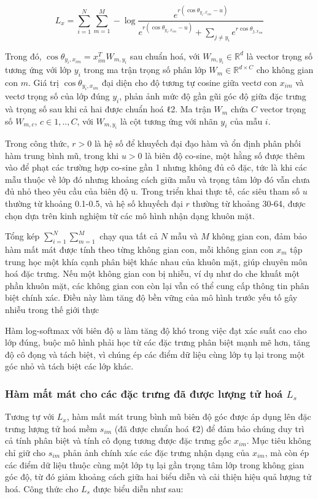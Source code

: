 \begin{equation}
    L_x = \sum_{i=1}^N \sum_{m=1}^M - \log \frac{e^{r(\cos\theta_{y_i, x_{im}} - u)}}{e^{r(\cos\theta_{y_i, x_{im}} - u)} + \sum_{j \neq y_i} e^{r\cos\theta_{j, x_{im}}}}
\end{equation}

Trong đó, $\cos \theta_{y_i, x_{im}} = x^T_{im} W_{m,y_i}$ sau chuẩn hoá, với $W_{m,y_i} \in \mathbb{R}^d$ là vector trọng số tương ứng với lớp $y_i$ trong ma trận trọng số phân lớp $W_m \in \mathbb{R}^{d \times C}$ cho không gian con $m$. Giá trị $\cos \theta_{y_i, x_{im}}$ đại diện cho độ tương tự cosine giữa vectơ con $x_{im}$ và vectơ trọng số của lớp đúng $y_i$, phản ảnh mức độ gần gũi góc độ giữa đặc trưng và trọng số sau khi cả hai được chuẩn hoá ℓ2. Ma trận $W_m$ chứa $C$ vector trọng số $W_{m,c}$, $ c \in {1,..,C}$, với $W_{m,y_i}$ là cột tương ứng với nhãn $y_i$ của mẫu $i$.

Trong công thức, $r > 0$ là hệ số để khuyếch đại đạo hàm và ổn định phân phối hàm trung bình mũ, trong khi $u > 0$ là biên độ co-sine, một hằng số được thêm vào để phạt các trường hợp co-sine gần 1 nhưng không đủ cô đặc, tức là khi các mẫu thuộc về lớp đó nhưng khoảng cách giữa mẫu và trọng tâm lớp đó vẫn chưa đủ nhỏ theo yêu cầu của biên độ u. Trong triển khai thực tế, các siêu tham số $u$ thường từ khoảng 0.1-0.5, và hệ số khuyếch đại $r$ thường từ khoảng 30-64, được chọn dựa trên kinh nghiệm từ các mô hình nhận dạng khuôn mặt.

Tổng kép $ \sum_{i=1}^N \sum_{m=1}^M $ chạy qua tất cả $N$ mẫu và $M$ không gian con, đảm bảo hàm mất mát được tính theo từng không gian con, mỗi không gian con $x_m$ tập trung học một khía cạnh phân biệt khác nhau của khuôn mặt, giúp chuyên môn hoá đặc trưng. Nếu một không gian con bị nhiễu, ví dụ như do che khuất một phần khuôn mặt, các không gian con còn lại vẫn có thể cung cấp thông tin phân biệt chính xác. Điều này làm tăng độ bền vững của mô hình trước yếu tố gây nhiễu trong thế giới thực

Hàm log-softmax với biên độ $u$ làm tăng độ khó trong việc đạt xác suất cao cho lớp đúng, buộc mô hình phải học từ các đặc trưng phân biệt mạnh mẽ hơn, tăng độ cô đọng và tách biệt, vì chúng ép các điểm dữ liệu cùng lớp tụ lại trong một góc nhỏ và tách biệt các lớp khác.
 
\subsubsection{Hàm mất mát cho các đặc trưng đã được lượng tử hoá $L_s$}
Tương tự với $L_x$, hàm mất mát trung bình mũ biên độ góc được áp dụng lên đặc trưng lượng tử hoá mềm $s_{im}$ (đã được chuẩn hoá ℓ2) để đảm bảo chúng duy trì cả tính phân biệt và tính cô đọng tương được đặc trưng gốc $x_{im}$. Mục tiêu không chỉ giữ cho $s_{im}$ phản ảnh chính xác các đặc trưng nhận dạng của $x_{im}$, mà còn ép các điểm dữ liệu thuộc cùng một lớp tụ lại gần trọng tâm lớp trong không gian góc độ, từ đó giảm khoảng cách giữa hai biểu diễn và cải thiện hiệu quả lượng tử hoá. Công thức cho $L_s$ được biểu diễn như sau:


